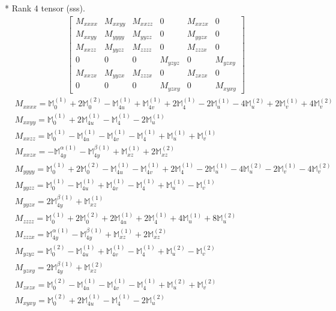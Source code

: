 \documentclass[fleqn,8pt,landscape]{jsarticle}
\begin{document}
* Rank 4 tensor (sss).
\begin{align*}
\begin{bmatrix} M_{xxxx} & M_{xxyy} & M_{xxzz} & 0 & M_{xxzx} & 0 \\ M_{xxyy} & M_{yyyy} & M_{yyzz} & 0 & M_{yyzx} & 0 \\ M_{xxzz} & M_{yyzz} & M_{zzzz} & 0 & M_{zzzx} & 0 \\ 0 & 0 & 0 & M_{yzyz} & 0 & M_{yzxy} \\ M_{xxzx} & M_{yyzx} & M_{zzzx} & 0 & M_{zxzx} & 0 \\ 0 & 0 & 0 & M_{yzxy} & 0 & M_{xyxy} \end{bmatrix}
\end{align*}
\begin{align*}
& M_{xxxx} = \mathbb{M}_{0}^{(1)} + 2 \mathbb{M}_{0}^{(2)} - \mathbb{M}_{4u}^{(1)} + \mathbb{M}_{4v}^{(1)} + 2 \mathbb{M}_{4}^{(1)} - 2 \mathbb{M}_{u}^{(1)} - 4 \mathbb{M}_{u}^{(2)} + 2 \mathbb{M}_{v}^{(1)} + 4 \mathbb{M}_{v}^{(2)} \\
& M_{xxyy} = \mathbb{M}_{0}^{(1)} + 2 \mathbb{M}_{4u}^{(1)} - \mathbb{M}_{4}^{(1)} - 2 \mathbb{M}_{u}^{(1)} \\
& M_{xxzz} = \mathbb{M}_{0}^{(1)} - \mathbb{M}_{4u}^{(1)} - \mathbb{M}_{4v}^{(1)} - \mathbb{M}_{4}^{(1)} + \mathbb{M}_{u}^{(1)} + \mathbb{M}_{v}^{(1)} \\
& M_{xxzx} = - \mathbb{M}_{4y}^{\alpha(1)} - \mathbb{M}_{4y}^{\beta(1)} + \mathbb{M}_{xz}^{(1)} + 2 \mathbb{M}_{xz}^{(2)} \\
& M_{yyyy} = \mathbb{M}_{0}^{(1)} + 2 \mathbb{M}_{0}^{(2)} - \mathbb{M}_{4u}^{(1)} - \mathbb{M}_{4v}^{(1)} + 2 \mathbb{M}_{4}^{(1)} - 2 \mathbb{M}_{u}^{(1)} - 4 \mathbb{M}_{u}^{(2)} - 2 \mathbb{M}_{v}^{(1)} - 4 \mathbb{M}_{v}^{(2)} \\
& M_{yyzz} = \mathbb{M}_{0}^{(1)} - \mathbb{M}_{4u}^{(1)} + \mathbb{M}_{4v}^{(1)} - \mathbb{M}_{4}^{(1)} + \mathbb{M}_{u}^{(1)} - \mathbb{M}_{v}^{(1)} \\
& M_{yyzx} = 2 \mathbb{M}_{4y}^{\beta(1)} + \mathbb{M}_{xz}^{(1)} \\
& M_{zzzz} = \mathbb{M}_{0}^{(1)} + 2 \mathbb{M}_{0}^{(2)} + 2 \mathbb{M}_{4u}^{(1)} + 2 \mathbb{M}_{4}^{(1)} + 4 \mathbb{M}_{u}^{(1)} + 8 \mathbb{M}_{u}^{(2)} \\
& M_{zzzx} = \mathbb{M}_{4y}^{\alpha(1)} - \mathbb{M}_{4y}^{\beta(1)} + \mathbb{M}_{xz}^{(1)} + 2 \mathbb{M}_{xz}^{(2)} \\
& M_{yzyz} = \mathbb{M}_{0}^{(2)} - \mathbb{M}_{4u}^{(1)} + \mathbb{M}_{4v}^{(1)} - \mathbb{M}_{4}^{(1)} + \mathbb{M}_{u}^{(2)} - \mathbb{M}_{v}^{(2)} \\
& M_{yzxy} = 2 \mathbb{M}_{4y}^{\beta(1)} + \mathbb{M}_{xz}^{(2)} \\
& M_{zxzx} = \mathbb{M}_{0}^{(2)} - \mathbb{M}_{4u}^{(1)} - \mathbb{M}_{4v}^{(1)} - \mathbb{M}_{4}^{(1)} + \mathbb{M}_{u}^{(2)} + \mathbb{M}_{v}^{(2)} \\
& M_{xyxy} = \mathbb{M}_{0}^{(2)} + 2 \mathbb{M}_{4u}^{(1)} - \mathbb{M}_{4}^{(1)} - 2 \mathbb{M}_{u}^{(2)}
\end{align*}
\end{document}
